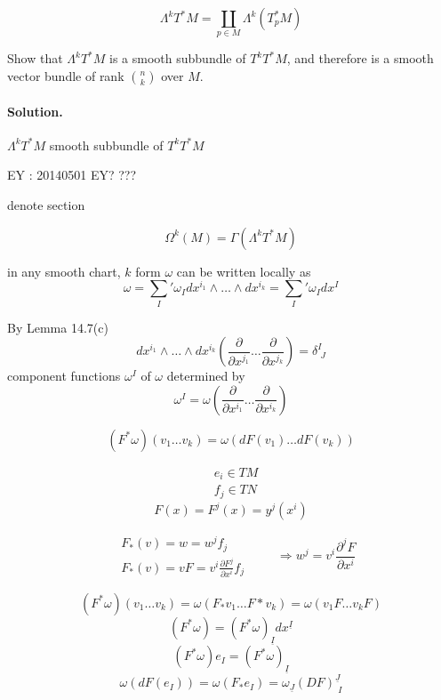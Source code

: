 \[
\Lambda^k T^*M = \coprod_{ p \in M} \Lambda^k{ ( T^*_p M )}
\]

\begin{exercise}
Show that $\Lambda^kT^*M$ is a smooth subbundle of $T^kT^*M$, and therefore is a smooth vector bundle of rank $\binom{n}{k}$ over $M$.
\end{exercise}
\paragraph{Solution.} 

$\Lambda^k T^*M$ smooth subbundle of $T^kT^*M$

EY : 20140501 EY? ???

\hrulefill

denote section

\[
\Omega^k{ (M) } = \Gamma{ (\Lambda^k T^* M ) }
\]



in any smooth chart, $k$ form $\omega$ can be written locally as 
\[
\omega = \sum_I' \omega_I dx^{i_1} \wedge \dots \wedge dx^{i_k} = \sum_I' \omega_I dx^I
\]

By Lemma 14.7(c)
\[
dx^{i_1} \wedge \dots \wedge dx^{i_k} \left( \frac{ \partial }{ \partial x^{j_1} } \dots \frac{ \partial }{ \partial x^{j_k} } \right) = \delta^I_{\, \, J}
\]
component functions $\omega^I$ of $\omega$ determined by 
\[
\omega^I = \omega\left( \frac{ \partial }{ \partial x^{i_1} } \dots \frac{ \partial }{ \partial x^{i_k} } \right)
\]

\[
(F^* \omega)(v_1 \dots v_k) = \omega( dF(v_1) \dots dF(v_k) )
\]

\[
\begin{aligned}
  & e_i \in TM \\ 
  & f_j \in TN
\end{aligned}
\]
\[
F(x) = F^j(x) = y^j( x^i)
\]

\[
\begin{aligned}
  & F_*(v) = w = w^j f_j \\ 
  & F_*(v) = vF = v^i \frac{ \partial F^j}{ \partial x^i } f_j
\end{aligned} \quad \quad \, \Longrightarrow w^j = v^i \frac{ \partial^j F}{ \partial x^i}
\]

\[
(F^*\omega)(v_1 \dots v_k)  = \omega(F_*v_1 \dots F*v_k) = \omega(v_1 F \dots v_k F)
\]
\[
(F^*\omega) = (F^* \omega)_{ \underline{I}} dx^{ \underline{I}}
\]
\[
(F^* \omega) e_I = (F^* \omega)_{\underline{I}}
\]
\[
\omega(dF(e_I)) = \omega(F_* e_I) = \omega_{\underline{J}}(DF)^{\underline{J}}_{ \, \, I }
\]

